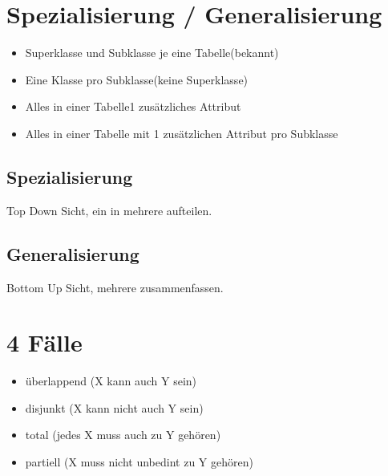 \documentclass[a4paper,8pt]{article} %
\begin{document}
\begin{small}
\begin{minipage}{0.32 \linewidth}
		\section{Spezialisierung / Generalisierung}
			\begin{itemize}
				\item Superklasse und Subklasse je eine Tabelle(bekannt)
				\item Eine Klasse pro Subklasse(keine Superklasse)
				\item Alles in einer Tabelle1 zusätzliches Attribut
				\item Alles in einer Tabelle mit 1 zusätzlichen Attribut pro Subklasse
			\end{itemize}
			\subsection{Spezialisierung}
				Top Down Sicht, ein in mehrere aufteilen.
			\subsection{Generalisierung}
				Bottom Up Sicht, mehrere zusammenfassen.
	\end{minipage}
	\section{4 Fälle}
		\begin{itemize}
			\item überlappend (X kann auch Y sein)
			\item disjunkt (X kann nicht auch Y sein)
			\item total (jedes X muss auch zu Y gehören)
			\item partiell (X muss nicht unbedint zu Y gehören)
		\end{itemize}
	\end{small}
\end{document}
